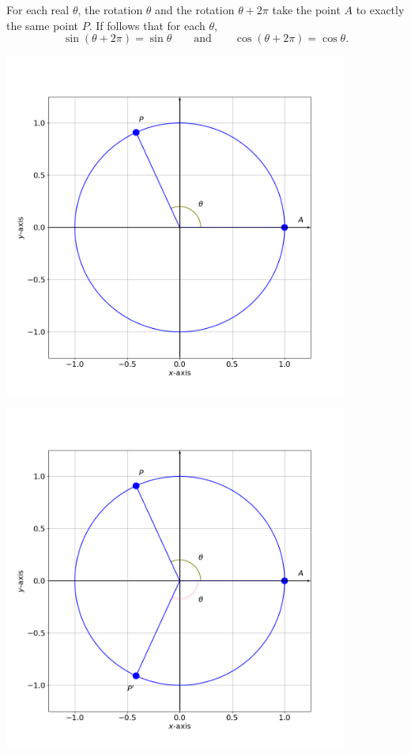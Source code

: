 \documentclass[11pt]{book}
\begin{document}
For each real $\theta$, the rotation $\theta$ and the rotation $\theta+2\pi$ take the point $A$ to exactly the same point $P$. If follows that for each $\theta$, $$\sin(\theta+2\pi)=\sin\theta\qquad\text{and}\qquad\cos(\theta+2\pi)=\cos\theta.$$

\begin{center}
    \begin{minipage}{0.48\textwidth}
        \begin{center}
            \includegraphics[width=0.85\textwidth]{unit_circle_1.png}
        \end{center}
    \end{minipage}
    \begin{minipage}{0.48\textwidth}
        \begin{center}
            \includegraphics[width=0.85\textwidth]{unit_circle_2.png}
        \end{center}
    \end{minipage}
\end{center}
\end{document}
